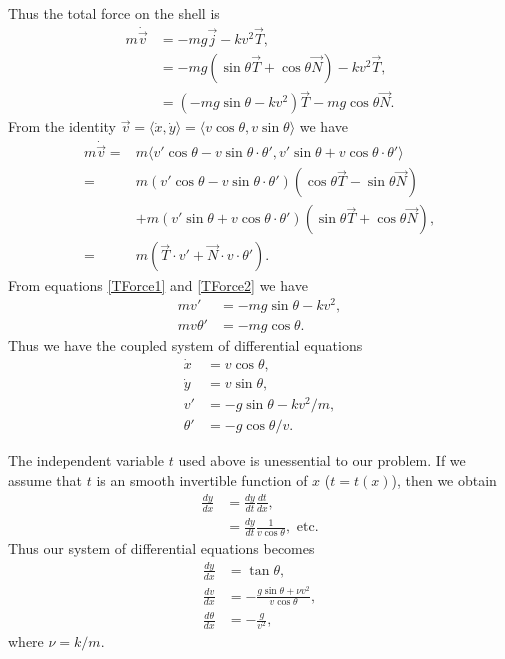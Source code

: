 Thus the total force on the shell is 
\begin{align}
m \dot{\vec{v}} &= -mg \vec{j} - kv^2 \vec{T},\nonumber \\
&= -mg( \sin{\theta} \vec{T} + \cos{\theta} \vec{N} ) - kv^2 \vec{T},\nonumber\\
&= (-mg \sin{\theta} - k v^2 ) \vec{T} - mg \cos{\theta} \vec{N}.\label{TForce1}
\end{align}
From the identity 
$\vec{v} = \langle \dot{x}, \dot{y} \rangle = \langle v \cos{\theta}, v \sin{\theta} \rangle$ 
we have 
\begin{align}
m \dot{\vec{v}} = {} & m\langle v' \cos{\theta} - v\sin{\theta} \cdot \theta' ,v'\sin{\theta} + v\cos{\theta} \cdot \theta' \rangle \nonumber \\
= {} & m(v'\cos{\theta} - v\sin{\theta} \cdot \theta')(\cos{\theta} \vec{T} - \sin{\theta}\vec{N}) \nonumber \\
& + m(v' \sin{\theta} + v\cos{\theta} \cdot \theta')( \sin{\theta} \vec{T} + \cos{\theta} \vec{N}) ,  \nonumber \\
= {} & m(\vec{T} \cdot v' + \vec{N} \cdot v \cdot \theta') . \label{TForce2}
\end{align}
From equations \eqref{TForce1} and \eqref{TForce2} we have 
\begin{align*}
mv' &= -mg\sin{\theta} - k v^2,\\
mv\theta' &= -mg \cos{\theta}.
\end{align*}
Thus we have the coupled system of differential equations
\begin{align}
\dot{x} &= v\cos{\theta}, \nonumber \\
\dot{y} &= v\sin{\theta},\nonumber \\
v' &= -g\sin{\theta} -  k v^2/m,\nonumber \\
\theta' &= -g \cos{\theta}/v. \nonumber
\end{align}


The independent variable $t$ used above is unessential to our problem. If we assume that $t$ is an smooth invertible function of $x$ ($t = t(x)$), then we obtain 
\begin{align*}
\frac{dy}{dx} &= \frac{dy}{dt}\frac{dt}{dx} ,\\
&= \frac{dy}{dt} \frac{1}{v\cos{\theta}}, \text{  etc.}
\end{align*}
Thus our system of differential equations becomes 
\begin{align}
\frac{dy}{dx} &= \tan {\theta} ,\nonumber\\
\frac{dv}{dx} &= -\frac{g \sin{\theta} + \nu v^2}{v \cos{\theta}},\nonumber\\
\frac{d\theta}{dx} &= -\frac{g}{v^2}, \label{cannon_DEs}
\end{align}
where $\nu = k/m.$

